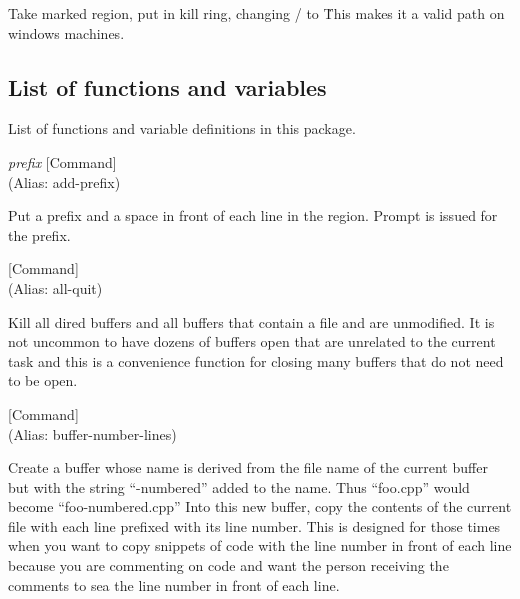 \begin{doc-string}
Take marked region, put in kill ring, changing / to \.
This makes it a valid path on windows machines.
\end{doc-string}

\subsection{List of functions and variables}

List of functions and variable definitions in this package.



\vspace{1em}
\noindent
{}
\usebox{\funcname}\emph{prefix}
 \hfill [Command]\\%
 (Alias: add-prefix)

\begin{doc-string}
Put a prefix and a space in front of each line in the region.  Prompt is issued
for the prefix.
\end{doc-string}

\vspace{1em}
\noindent
{}
\usebox{\funcname}
 \hfill [Command]\\%
 (Alias: all-quit)

\begin{doc-string}
Kill all dired buffers and all buffers that contain a file and are unmodified.
It is not uncommon to have dozens of buffers open that are unrelated to the current task
and this is a convenience function for closing many buffers that do not need to
be open.
\end{doc-string}

\vspace{1em}
\noindent
{}
\usebox{\funcname}
 \hfill [Command]\\%
 (Alias: buffer-number-lines)

\begin{doc-string}
Create a buffer whose name is derived from the file name of the current
buffer but with the string ``-numbered'' added to the name.  Thus ``foo.cpp''
would become ``foo-numbered.cpp'' Into this new buffer, copy the contents of the
current file with each line prefixed with its line number.  This is designed for
those times when you want to copy snippets of code with the line number in front
of each line because you are commenting on code and want the person receiving
the comments to sea the line number in front of each line.
\end{doc-string}

